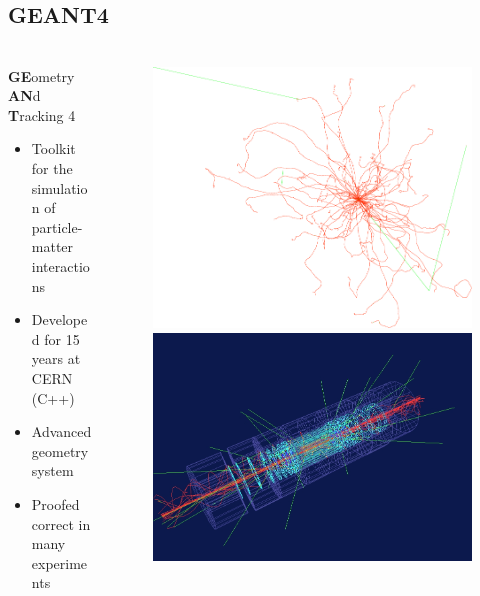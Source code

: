 \documentclass{beamer}
\newcommand{\ident}{\thesection.\thesubsection}
\newcommand{\mysubsection}[1]{\subsection{#1}\label{\ident}}
\newcommand{\ftitle}{\frametitle{\nameref{\ident}}}
\newcommand{\geant}{G{\smaller EANT}4 }
\begin{document}
\mysubsection{\geant}

\begin{frame}
	\ftitle
	\begin{columns}
		\begin{column}{6cm}
			\begin{block}{\textbf{GE}ometry \textbf{AN}d \textbf{T}racking 4}
				\begin{itemize}
					\item Toolkit for the simulation of particle-matter interactions
					\item Developed for 15 years at CERN (C++)
					\item Advanced geometry system
					\item Proofed correct in many experiments
				\end{itemize}
			\end{block}
		\end{column}
		\begin{column}{5cm}
			\begin{figure}
				\includegraphics[width=0.55\columnwidth]{img/geant_e}\vskip 0.5cm
				\includegraphics[width=0.95\columnwidth]{img/atlas}
			\end{figure}
		\end{column}
	\end{columns}
\end{frame}
\end{document}
